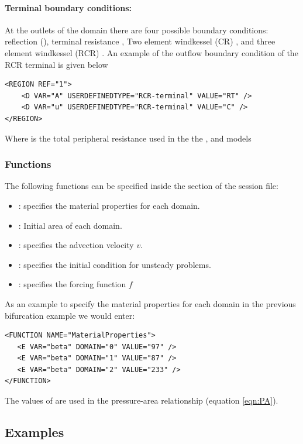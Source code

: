 \paragraph{Terminal boundary conditions:~} At the outlets of the domain there are four possible boundary conditions: reflection (), terminal resistance , 
Two element windkessel (CR)  , and three element windkessel (RCR) .  An example of the outflow boundary condition of the RCR terminal is given below
\begin{lstlisting}[style=XmlStyle]
<REGION REF="1">
	<D VAR="A" USERDEFINEDTYPE="RCR-terminal" VALUE="RT" />
	<D VAR="u" USERDEFINEDTYPE="RCR-terminal" VALUE="C" />
</REGION>
\end{lstlisting}
Where  is the total peripheral resistance  used in the the  ,  and   models

\subsubsection{Functions}
The following functions can be specified inside the  section
of the session file:
\begin{itemize}
\item  {}: specifies the material properties for each domain.
\item  {}: Initial area of each domain.
\item {}: specifies the advection velocity $v$.
\item {}: specifies the initial condition for unsteady
 problems.
\item {}: specifies the forcing function $f$
\end{itemize}

As an example to specify the material properties for each domain in the previous bifurcation example we would enter:
\begin{lstlisting}[style=XmlStyle]
<FUNCTION NAME="MaterialProperties">
   <E VAR="beta" DOMAIN="0" VALUE="97" />
   <E VAR="beta" DOMAIN="1" VALUE="87" />
   <E VAR="beta" DOMAIN="2" VALUE="233" />
</FUNCTION>
\end{lstlisting}
The values of  are used in the pressure-area relationship (equation \ref{eqn:PA}). 

\subsection{Examples}

